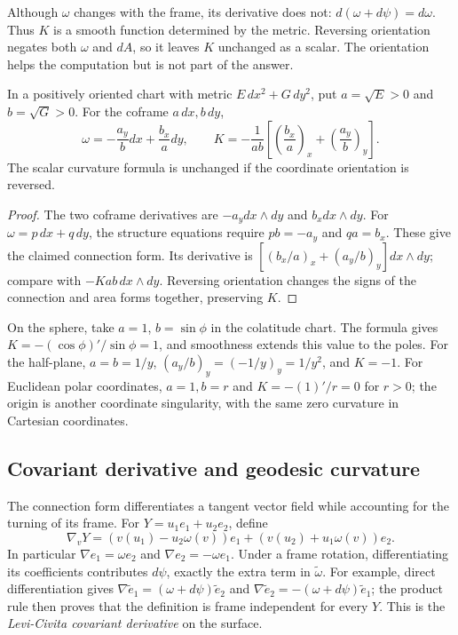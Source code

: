 Although $\omega$ changes with the frame, its derivative does not: $d(\omega+d\psi)=d\omega$. Thus $K$ is a smooth function determined by the metric. Reversing orientation negates both $\omega$ and $dA$, so it leaves $K$ unchanged as a scalar. The orientation helps the computation but is not part of the answer.

\begin{proposition}\label{prop:orthocurv}
In a positively oriented chart with metric $E\,dx^2+G\,dy^2$, put $a=\sqrt E>0$ and $b=\sqrt G>0$. For the coframe $a\,dx,b\,dy$,
\[
\omega=-\frac{a_y}{b}dx+\frac{b_x}{a}dy,\qquad
K=-\frac1{ab}\left[\left(\frac{b_x}{a}\right)_x+\left(\frac{a_y}{b}\right)_y\right].
\]
The scalar curvature formula is unchanged if the coordinate orientation is reversed.
\end{proposition}

\begin{proof}
The two coframe derivatives are $-a_y dx\wedge dy$ and $b_x dx\wedge dy$. For $\omega=p\,dx+q\,dy$, the structure equations require $pb=-a_y$ and $qa=b_x$. These give the claimed connection form. Its derivative is $[(b_x/a)_x+(a_y/b)_y]dx\wedge dy$; compare with $-K ab\,dx\wedge dy$. Reversing orientation changes the signs of the connection and area forms together, preserving $K$.
\end{proof}

\begin{example}\label{ex:curvexamples}
On the sphere, take $a=1$, $b=\sin\phi$ in the colatitude chart. The formula gives $K=-(\cos\phi)'/\sin\phi=1$, and smoothness extends this value to the poles. For the half-plane, $a=b=1/y$, $(a_y/b)_y=(-1/y)_y=1/y^2$, and $K=-1$. For Euclidean polar coordinates, $a=1,b=r$ and $K=-(1)'/r=0$ for $r>0$; the origin is another coordinate singularity, with the same zero curvature in Cartesian coordinates.
\end{example}

\subsection*{Covariant derivative and geodesic curvature}

The connection form differentiates a tangent vector field while accounting for the turning of its frame. For $Y=u_1e_1+u_2e_2$, define
\[
\nabla_vY=(v(u_1)-u_2\omega(v))e_1+(v(u_2)+u_1\omega(v))e_2.
\]
In particular $\nabla e_1=\omega e_2$ and $\nabla e_2=-\omega e_1$. Under a frame rotation, differentiating its coefficients contributes $d\psi$, exactly the extra term in $\tilde\omega$. For example, direct differentiation gives $\nabla\tilde e_1=(\omega+d\psi)\tilde e_2$ and $\nabla\tilde e_2=-(\omega+d\psi)\tilde e_1$; the product rule then proves that the definition is frame independent for every $Y$. This is the \emph{Levi-Civita covariant derivative} on the surface.

